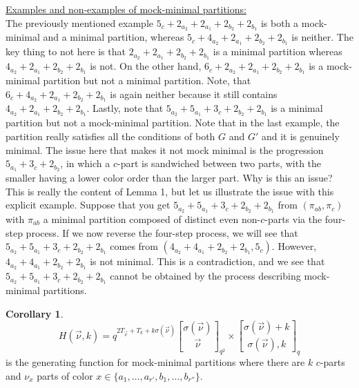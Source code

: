 \documentclass[12pt,a4paper]{amsart}
\theoremstyle{definition}
\theoremstyle{notation}
\theoremstyle{corollary}
\newtheorem{corollary}{Corollary}
\begin{document}
\underline{Examples and non-examples of mock-minimal partitions:}\\
The previously mentioned example $5_c+2_{a_2}+2_{a_1}+2_{b_2}+2_{b_1}$ is both a mock-minimal and a minimal partition, whereas  $5_c+4_{a_2}+2_{a_1}+2_{b_2}+2_{b_1}$ is neither. The key thing to not here is that $2_{a_2}+2_{a_1}+2_{b_2}+2_{b_1}$ is a minimal partition whereas $4_{a_2}+2_{a_1}+2_{b_2}+2_{b_1}$ is not. On the other hand, $6_c+2_{a_2}+2_{a_1}+2_{b_2}+2_{b_1}$ is a mock-minimal partition but not a minimal partition. Note, that $6_c+4_{a_2}+2_{a_1}+2_{b_2}+2_{b_1}$ is again neither because it still contains $4_{a_2}+2_{a_1}+2_{b_2}+2_{b_1}$. Lastly, note that $5_{a_2}+5_{a_1}+3_c+2_{b_2}+2_{b_1}$ is a minimal partition but not a mock-minimal partition. Note that in the last example, the partition really satisfies all the conditions of both $G$ and $G'$ and it is genuinely minimal. The issue here that makes it not mock minimal is the progression $5_{a_1}+3_c+2_{b_2}$, in which a $c$-part is sandwiched between two parts, with the smaller having a lower color order than the larger part. Why is this an issue? This is really the content of Lemma 1, but let us illustrate the issue with this explicit example. Suppose that you get $5_{a_2}+5_{a_1}+3_c+2_{b_2}+2_{b_1}$ from $(\pi_{ab},\pi_c)$ with $\pi_{ab}$ a minimal partition composed of distinct even non-$c$-parts via the four-step process. If we now reverse the four-step process, we will see that $5_{a_2}+5_{a_1}+3_c+2_{b_2}+2_{b_1}$ comes from $(4_{a_2}+4_{a_1}+2_{b_2}+2_{b_1},5_c)$. However, $4_{a_2}+4_{a_1}+2_{b_2}+2_{b_1}$ is not minimal. This is a contradiction, and we see that $5_{a_2}+5_{a_1}+3_c+2_{b_2}+2_{b_1}$ cannot be obtained by the process describing mock-minimal partitions.




\begin{corollary}
     \[H(\vec{\nu},k)= q^{2T_{\vec{\nu}}+T_k+k\sigma(\vec{\nu})}{\sigma(\vec{\nu})\brack \vec{\nu}}_{q^2}\times {\sigma(\vec{\nu})+k\brack \sigma(\vec{\nu}),k}_{q}\tag{4.1}\]
is the generating function for mock-minimal partitions where there are $k$ $c$-parts and $\nu_x$ parts of color $x\in\{a_1,\dots,a_{r'},b_1,\dots,b_{r''}\}$. 
\end{corollary}
\end{document}
